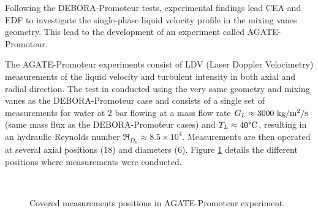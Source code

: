 Following the DEBORA-Promoteur tests, experimental findings lead CEA and EDF to investigate the single-phase liquid velocity profile in the mixing vanes geometry. This lead to the development of an experiment called AGATE-Promoteur.

\npar

The AGATE-Promoteur experiments consist of LDV (Laser Doppler Velocimetry) measurements of the liquid velocity and turbulent intensity in both axial and radial direction. The test in conducted using the very same geometry and mixing vanes as the DEBORA-Promoteur case and consists of a single set of measurements for water at 2 bar flowing at a mass flow rate $G_{L} \approx 3000\ \text{kg/m$^{2}$/s}$ (same mass flux as the DEBORA-Promoteur cases) and $T_{L} \approx 40\degree\mathrm{C}$, resulting in an hydraulic Reynolds number $\Re_{D_{h}} \approx 8.5\times 10^{4}$. Measurements are then operated at several axial positions (18) and diameters (6). Figure \ref{fig:agate_mes} details the different positions where measurements were conducted.




\begin{figure}[!h]
\centering
{}
\\
\caption{Covered measurements positions in AGATE-Promoteur experiment.}
\label{fig:agate_mes}
\end{figure}


